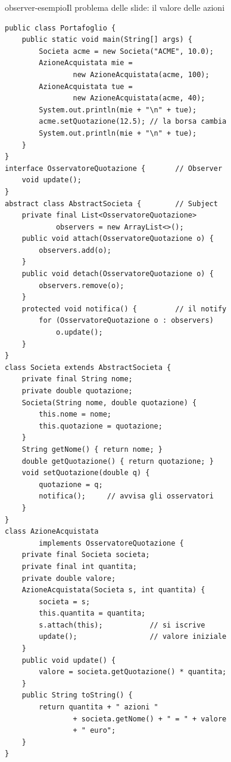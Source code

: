 \begin{programma}{observer-esempio}{Il problema delle slide: il valore delle azioni}
\begin{lstlisting}[style=javacs, name=Portafoglio.java]
public class Portafoglio {
    public static void main(String[] args) {
        Societa acme = new Societa("ACME", 10.0);
        AzioneAcquistata mie =
                new AzioneAcquistata(acme, 100);
        AzioneAcquistata tue =
                new AzioneAcquistata(acme, 40);
        System.out.println(mie + "\n" + tue);
        acme.setQuotazione(12.5); // la borsa cambia
        System.out.println(mie + "\n" + tue);
    }
}
interface OsservatoreQuotazione {       // Observer
    void update();
}
abstract class AbstractSocieta {        // Subject
    private final List<OsservatoreQuotazione>
            observers = new ArrayList<>();
    public void attach(OsservatoreQuotazione o) {
        observers.add(o);
    }
    public void detach(OsservatoreQuotazione o) {
        observers.remove(o);
    }
    protected void notifica() {         // il notify
        for (OsservatoreQuotazione o : observers)
            o.update();
    }
}
class Societa extends AbstractSocieta {
    private final String nome;
    private double quotazione;
    Societa(String nome, double quotazione) {
        this.nome = nome;
        this.quotazione = quotazione;
    }
    String getNome() { return nome; }
    double getQuotazione() { return quotazione; }
    void setQuotazione(double q) {
        quotazione = q;
        notifica();     // avvisa gli osservatori
    }
}
class AzioneAcquistata
        implements OsservatoreQuotazione {
    private final Societa societa;
    private final int quantita;
    private double valore;
    AzioneAcquistata(Societa s, int quantita) {
        societa = s;
        this.quantita = quantita;
        s.attach(this);           // si iscrive
        update();                 // valore iniziale
    }
    public void update() {
        valore = societa.getQuotazione() * quantita;
    }
    public String toString() {
        return quantita + " azioni "
                + societa.getNome() + " = " + valore
                + " euro";
    }
}
\end{lstlisting}
\tcblower
{}


\end{programma}
